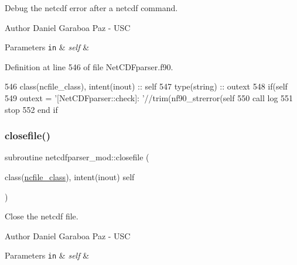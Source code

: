 Debug the netcdf error after a netcdf command. 

\begin{DoxyAuthor}{Author}
Daniel Garaboa Paz -\/ U\+SC 
\end{DoxyAuthor}

\begin{DoxyParams}[1]{Parameters}
\mbox{\tt in}  & {\em self} & \\
\hline
\end{DoxyParams}


Definition at line 546 of file Net\+C\+D\+Fparser.\+f90.


\begin{DoxyCode}
546     \textcolor{keywordtype}{class}(ncfile\_class), \textcolor{keywordtype}{intent(inout)} :: self
547     \textcolor{keywordtype}{type}(string) :: outext
548     \textcolor{keywordflow}{if}(self%
549         outext = \textcolor{stringliteral}{'[NetCDFparser::check]: '}//trim(nf90\_strerror(self%
550         \textcolor{keyword}{call }log%
551         stop
552 \textcolor{keywordflow}{    end if}
\end{DoxyCode}
\mbox{\label{namespacenetcdfparser__mod_a518627511cac4bf3dbc338bf3bfd5e24}} 
\subsubsection{\texorpdfstring{closefile()}{closefile()}}
{\footnotesize\ttfamily subroutine netcdfparser\+\_\+mod\+::closefile (\begin{DoxyParamCaption}\item[{class(\mbox{\hyperlink{structnetcdfparser__mod_1_1ncfile__class}{ncfile\+\_\+class}}), intent(inout)}]{self }\end{DoxyParamCaption})\hspace{0.3cm}{\ttfamily [private]}}



Close the netcdf file. 

\begin{DoxyAuthor}{Author}
Daniel Garaboa Paz -\/ U\+SC 
\end{DoxyAuthor}

\begin{DoxyParams}[1]{Parameters}
\mbox{\tt in}  & {\em self} & \\
\hline
\end{DoxyParams}


